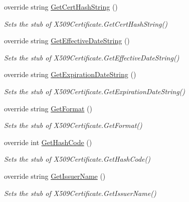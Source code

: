 \begin{DoxyCompactItemize}
override string \hyperlink{class_system_1_1_security_1_1_cryptography_1_1_x509_certificates_1_1_fakes_1_1_stub_x509_certificate2_a0b5553191620960eda961e614170cabe}{Get\-Cert\-Hash\-String} ()
\begin{DoxyCompactList}\small\item\em Sets the stub of X509\-Certificate.\-Get\-Cert\-Hash\-String()\end{DoxyCompactList}\item 
override string \hyperlink{class_system_1_1_security_1_1_cryptography_1_1_x509_certificates_1_1_fakes_1_1_stub_x509_certificate2_a762588de82bbb846d21e3ae22a257bf3}{Get\-Effective\-Date\-String} ()
\begin{DoxyCompactList}\small\item\em Sets the stub of X509\-Certificate.\-Get\-Effective\-Date\-String()\end{DoxyCompactList}\item 
override string \hyperlink{class_system_1_1_security_1_1_cryptography_1_1_x509_certificates_1_1_fakes_1_1_stub_x509_certificate2_a3e96affce42a8e956a6397873fadadda}{Get\-Expiration\-Date\-String} ()
\begin{DoxyCompactList}\small\item\em Sets the stub of X509\-Certificate.\-Get\-Expiration\-Date\-String()\end{DoxyCompactList}\item 
override string \hyperlink{class_system_1_1_security_1_1_cryptography_1_1_x509_certificates_1_1_fakes_1_1_stub_x509_certificate2_aebda63cbcd0c4f100be2bd6a1acafecb}{Get\-Format} ()
\begin{DoxyCompactList}\small\item\em Sets the stub of X509\-Certificate.\-Get\-Format()\end{DoxyCompactList}\item 
override int \hyperlink{class_system_1_1_security_1_1_cryptography_1_1_x509_certificates_1_1_fakes_1_1_stub_x509_certificate2_ab22b900a895680684526297b19864d41}{Get\-Hash\-Code} ()
\begin{DoxyCompactList}\small\item\em Sets the stub of X509\-Certificate.\-Get\-Hash\-Code()\end{DoxyCompactList}\item 
override string \hyperlink{class_system_1_1_security_1_1_cryptography_1_1_x509_certificates_1_1_fakes_1_1_stub_x509_certificate2_a77963eab22d5273ece3af83fc93d8577}{Get\-Issuer\-Name} ()
\begin{DoxyCompactList}\small\item\em Sets the stub of X509\-Certificate.\-Get\-Issuer\-Name()\end{DoxyCompactList}\item 

\end{DoxyCompactItemize}
